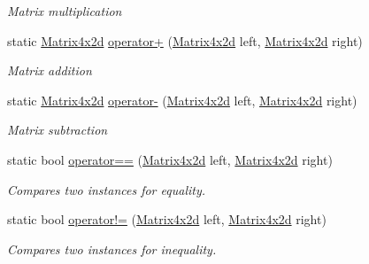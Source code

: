 \begin{DoxyCompactItemize}
\begin{DoxyCompactList}\small\item\em Matrix multiplication \end{DoxyCompactList}\item 
static \hyperlink{struct_open_t_k_1_1_matrix4x2d}{Matrix4x2d} \hyperlink{struct_open_t_k_1_1_matrix4x2d_a840f3eb152f551dbe75defc1db55831f}{operator+} (\hyperlink{struct_open_t_k_1_1_matrix4x2d}{Matrix4x2d} left, \hyperlink{struct_open_t_k_1_1_matrix4x2d}{Matrix4x2d} right)
\begin{DoxyCompactList}\small\item\em Matrix addition \end{DoxyCompactList}\item 
static \hyperlink{struct_open_t_k_1_1_matrix4x2d}{Matrix4x2d} \hyperlink{struct_open_t_k_1_1_matrix4x2d_a086317e3f430dccee2ead201d1f7be4b}{operator-\/} (\hyperlink{struct_open_t_k_1_1_matrix4x2d}{Matrix4x2d} left, \hyperlink{struct_open_t_k_1_1_matrix4x2d}{Matrix4x2d} right)
\begin{DoxyCompactList}\small\item\em Matrix subtraction \end{DoxyCompactList}\item 
static bool \hyperlink{struct_open_t_k_1_1_matrix4x2d_aa97e214beb4d10217dce8da614a8f126}{operator==} (\hyperlink{struct_open_t_k_1_1_matrix4x2d}{Matrix4x2d} left, \hyperlink{struct_open_t_k_1_1_matrix4x2d}{Matrix4x2d} right)
\begin{DoxyCompactList}\small\item\em Compares two instances for equality. \end{DoxyCompactList}\item 
static bool \hyperlink{struct_open_t_k_1_1_matrix4x2d_aca53e211b5be4a08cb0711455320ca33}{operator!=} (\hyperlink{struct_open_t_k_1_1_matrix4x2d}{Matrix4x2d} left, \hyperlink{struct_open_t_k_1_1_matrix4x2d}{Matrix4x2d} right)
\begin{DoxyCompactList}\small\item\em Compares two instances for inequality. \end{DoxyCompactList}\end{DoxyCompactItemize}
